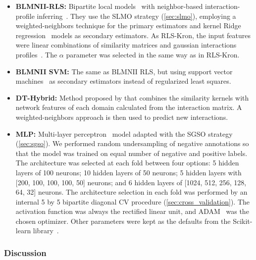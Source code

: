 \begin{itemize}
    \item \textbf{BLMNII-RLS:} Bipartite local models~\cite{yamanishi2008prediction,bleakley2009supervised} with neighbor-based interaction-profile inferring~\cite{mei2013drug}. They use the SLMO strategy (\autoref{sec:slmo}), employing a weighted-neighbors technique 
    for the primary estimators and kernel Ridge regression~\cite[p.~492-493]{murphy2012machine} models as secondary estimators.
    As RLS-Kron, the input features were linear combinations of similarity matrices and gaussian interactions profiles~\cite{vanlaarhoven2011gaussian}. The $\alpha$ parameter was selected in the same way as in RLS-Kron.

    \item \textbf{BLMNII SVM:} The same as BLMNII RLS, but using support vector machines~\cite{crammer2001algorithmic} as secondary estimators instead of regularized least squares.

    \item \textbf{DT-Hybrid:} Method proposed by  that combines the similarity kernels with network features of each domain calculated from the interaction matrix. A weighted-neighbors approach is then used to predict new interactions.  %

    \item \textbf{MLP:} Multi-layer perceptron~\cite{hastie2001elements} %
    model adapted with the SGSO strategy (\autoref{sec:sgso}). We performed random undersampling of negative annotations so that the model was trained on equal number of negative and positive labels. 
    The architecture was selected at each fold between four options: 5 hidden layers of 100 neurons; 10 hidden layers of 50 neurons; 5 hidden layers with [200, 100, 100, 100, 50] neurons; and 6 hidden layers of [1024, 512, 256, 128, 64, 32] neurons. The architecture selection in each fold was performed by an internal 5 by 5 bipartite diagonal CV procedure (\autoref{sec:cross_validation}).
    The activation function was always the rectified linear unit, and ADAM~\cite{kingma2017adam} was the chosen optimizer. Other parameters were kept as the defaults from the Scikit-learn library~\cite{pedregosa2011scikitlearn}.
\end{itemize}

\subsubsection{Discussion}

